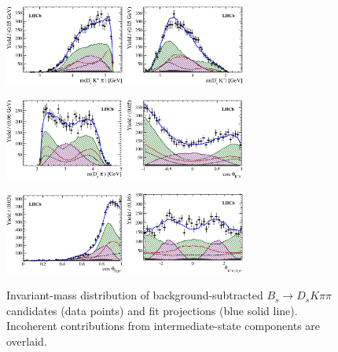 \begin{figure}[h]
		\includegraphics[width=0.35\textwidth, height = !]{figs/fullFit/signal_new/m_DsKpi_mod2.eps} 
		\includegraphics[width=0.35\textwidth, height = !]{figs/fullFit/signal_new/m_DsK_mod2.eps} 
		
		\includegraphics[width=0.35\textwidth, height = !]{figs/fullFit/signal_new/m_Dspim_mod2.eps} 
		\includegraphics[width=0.35\textwidth, height = !]{figs/fullFit/signal_new/h_cosTheta_Kpi_mod2.eps} 
		
		\includegraphics[width=0.35\textwidth, height = !]{figs/fullFit/signal_new/h_cosTheta_Dspi_mod2.eps} 
		\includegraphics[width=0.35\textwidth, height = !]{figs/fullFit/signal_new/h_phi_Kpi_Dspi_mod2.eps} 
		
		\caption{Invariant-mass distribution of background-subtracted $B_s\to D_s K \pi \pi$ candidates (data points) and fit projections (blue solid line). Incoherent contributions from intermediate-state components are overlaid. } 		
		\label{fig:fullFitb}
\end{figure}


